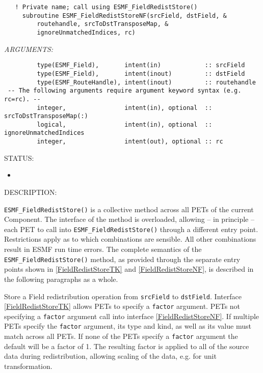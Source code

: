    
\begin{verbatim}   ! Private name; call using ESMF_FieldRedistStore() 
     subroutine ESMF_FieldRedistStoreNF(srcField, dstField, & 
         routehandle, srcToDstTransposeMap, &
         ignoreUnmatchedIndices, rc) \end{verbatim}{\em ARGUMENTS:}
\begin{verbatim}         type(ESMF_Field),       intent(in)            :: srcField  
         type(ESMF_Field),       intent(inout)         :: dstField  
         type(ESMF_RouteHandle), intent(inout)         :: routehandle
 -- The following arguments require argument keyword syntax (e.g. rc=rc). --
         integer,                intent(in), optional  :: srcToDstTransposeMap(:) 
         logical,                intent(in), optional  :: ignoreUnmatchedIndices
         integer,                intent(out), optional :: rc \end{verbatim}
{\sf STATUS:}
   \begin{itemize}
   \item{}
   \end{itemize}
  
{\sf DESCRIPTION:\\ }

 
   
   \label{FieldRedistStoreNF}
   {\tt ESMF\_FieldRedistStore()} is a collective method across all PETs of the
   current Component. The interface of the method is overloaded, allowing 
   -- in principle -- each PET to call into {\tt ESMF\_FieldRedistStore()}
   through a different entry point. Restrictions apply as to which combinations
   are sensible. All other combinations result in ESMF run time errors. The
   complete semantics of the {\tt ESMF\_FieldRedistStore()} method, as provided
   through the separate entry points shown in \ref{FieldRedistStoreTK} and
   \ref{FieldRedistStoreNF}, is described in the following paragraphs as a whole.
  
   Store a Field redistribution operation from {\tt srcField} to {\tt dstField}.
   Interface \ref{FieldRedistStoreTK} allows PETs to specify a {\tt factor}
   argument. PETs not specifying a {\tt factor} argument call into interface
   \ref{FieldRedistStoreNF}. If multiple PETs specify the {\tt factor} argument,
   its type and kind, as well as its value must match across all PETs. If none
   of the PETs specify a {\tt factor} argument the default will be a factor of
   1. The resulting factor is applied to all of the source data during
   redistribution, allowing scaling of the data, e.g. for unit transformation.
    
